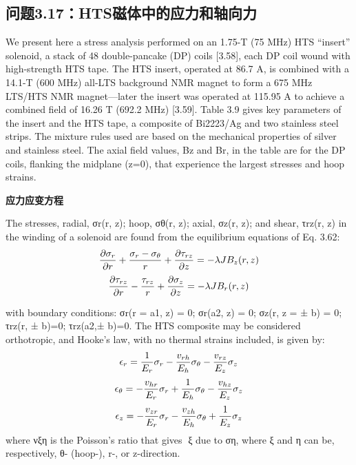 \subsection{问题3.17：HTS磁体中的应力和轴向力}
We present here a stress analysis performed on an 1.75-T (75 MHz) HTS “insert”
solenoid, a stack of 48 double-pancake (DP) coils [3.58], each DP coil wound with
high-strength HTS tape. The HTS insert, operated at 86.7 A, is combined with a
14.1-T (600 MHz) all-LTS background NMR magnet to form a 675 MHz LTS/HTS
NMR magnet—later the insert was operated at 115.95 A to achieve a combined
field of 16.26 T (692.2 MHz) [3.59]. Table 3.9 gives key parameters of the insert
and the HTS tape, a composite of Bi2223/Ag and two stainless steel strips. The
mixture rules used are based on the mechanical properties of silver and stainless
steel. The axial field values, Bz and Br, in the table are for the DP coils, flanking
the midplane (z=0), that experience the largest stresses and hoop strains.

\textbf{应力应变方程}

The stresses, radial, σr(r, z); hoop, σθ(r, z); axial, σz(r, z); and shear, τrz(r, z) in
the winding of a solenoid are found from the equilibrium equations of Eq. 3.62:
$$
\frac{\partial\sigma_{r}}{\partial r}+\frac{\sigma_{r}-\sigma_{\theta}}{r}+\frac{\partial\tau_{rz}}{\partial z}=-\lambda JB_{z}(r,z)\\%
$$
$$
\frac{\partial\tau_{rz}}{\partial r}-\frac{\tau_{rz}}{r}+\frac{\partial\sigma_{z}}{\partial z}=-\lambda JB_{r}(r,z)\\%
$$

with boundary conditions: σr(r = a1, z) = 0; σr(a2, z) = 0; σz(r, z = ± b) = 0;
τrz(r, ± b)=0; τrz(a2,± b)=0. The HTS composite may be considered orthotropic,
and Hooke’s law, with no thermal strains included, is given by:
$$
\epsilon_{r}=\frac{1}{E_{r}}\sigma_{r}-\frac{v_{rh}}{E_{h}}\sigma_{\theta}-\frac{v_{rz}}{E_{z}}\sigma_{z}\\%
$$
$$
\epsilon_{\theta}=-\frac{v_{hr}}{E_{r}}\sigma_{r}+\frac{1}{E_{h}}\sigma_{\theta}-\frac{v_{hz}}{E_{z}}\sigma_{z}\\%
$$
$$
\epsilon_{z}=-\frac{v_{zr}}{E_{r}}\sigma_{r}-\frac{v_{zh}}{E_{h}}\sigma_{\theta}+\frac{1}{E_{z}}\sigma_{z}\\%
$$
where νξη is the Poisson’s ratio that gives ξ due to ση, where ξ and η can be,
respectively, θ- (hoop-), r-, or z-direction.



